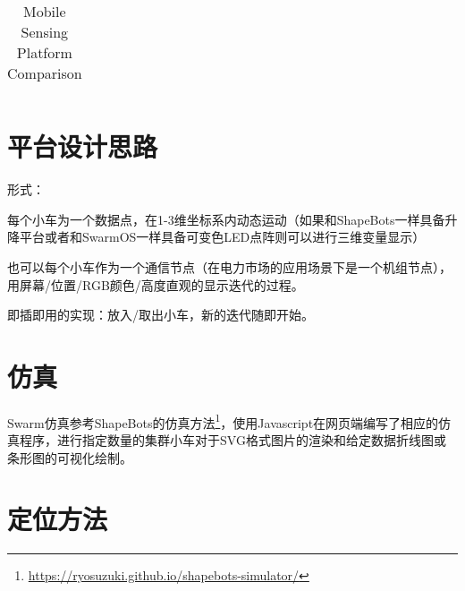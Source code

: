 \begin{landscape}
\begin{table}[]
\begin{tabular}{lllllll}
    \end{tabular}
    \caption{Mobile Sensing Platform Comparison\cite{betthauser2014wolfbot}}
    \label{tab:Comparison}
    \end{table}
\end{landscape}

\section{平台设计思路}
形式：

每个小车为一个数据点，在1-3维坐标系内动态运动（如果和ShapeBots\cite{suzuki2019shapebots}一样具备升降平台或者和SwarmOS一样具备可变色LED点阵则可以进行三维变量显示）

也可以每个小车作为一个通信节点（在电力市场的应用场景下是一个机组节点），用屏幕/位置/RGB颜色/高度直观的显示迭代的过程。

即插即用的实现：放入/取出小车，新的迭代随即开始。

\section{仿真}

Swarm仿真参考ShapeBots\cite{suzuki2019shapebots}的仿真方法\footnote{\href{https://ryosuzuki.github.io/shapebots-simulator/}{https://ryosuzuki.github.io/shapebots-simulator/}}，使用Javascript在网页端编写了相应的仿真程序，进行指定数量的集群小车对于SVG格式图片的渲染和给定数据折线图或条形图的可视化绘制。

\section{定位方法}

%  

